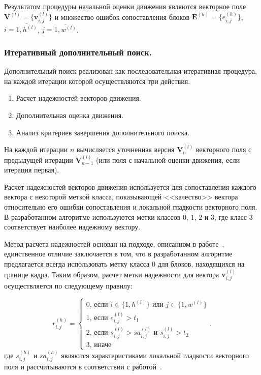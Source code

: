 Результатом процедуры начальной оценки движения являются векторное поле $\mathbf{V}^{(l)}=\lbrace\mathbf{v}_{i,j}^{(l)}\rbrace$ и множество ошибок сопоставления блоков $\mathbf{E}^{(h)}=\lbrace e_{i,j}^{(h)} \rbrace$, $i=\overline{1,h^{(l)}}$, $j=\overline{1,w^{(l)}}$.

\subsubsection{Итеративный дополнительный поиск.}
\label{chap2:4:1:3}

Дополнительный поиск реализован как последовательная итеративная процедура, на каждой итерации которой осуществляются три действия.
\begin{enumerate}
\item Расчет надежностей векторов движения.
\item Дополнительная оценка движения.
\item Анализ критериев завершения дополнительного поиска.
\end{enumerate}

На каждой итерации $n$ вычисляется уточненная версия $\mathbf{V}_n^{(l)}$ векторного поля с предыдущей итерации $\mathbf{V}_{n-1}^{(l)}$ (или поля с начальной оценки движения, если итерация первая).

Расчет надежностей векторов движения используется для сопоставления каждого вектора с некоторой меткой класса, показывающей <<качество>> вектора относительно его ошибки сопоставления и локальной гладкости векторного поля. В разработанном алгоритме используются метки классов $0$, $1$, $2$ и $3$, где класс $3$ соответствует наиболее надежному вектору.

Метод расчета надежностей основан на подходе, описанном в работе~\cite{Huang2009}, единственное отличие заключается в том, что в разработанном алгоритме предлагается всегда использовать метку класса $0$ для блоков, находящихся на границе кадра. Таким образом, расчет метки надежности для вектора $\mathbf{v}_{i,j}^{(l)}$ осуществляется по следующему правилу:

\begin{equation*}
r_{i,j}^{(h)}=
	\begin{cases}
	0 \text{, если $i\in\lbrace1,h^{(l)}\rbrace$ или $j\in\lbrace1,w^{(l)}\rbrace$}\\
	1 \text{, если $e_{i,j}^{(l)}>t_1$}\\
	2 \text{, если $s_{i,j}^{(l)}>sa_{i,j}^{(l)}$ и $s_{i,j}^{(l)}>t_2$}\\
	3 \text{, иначе}
	\end{cases}.
\end{equation*}
где $s_{i,j}^{(h)}$ и $sa_{i,j}^{(h)}$ являются характеристиками локальной гладкости векторного поля и рассчитываются в соответствии с работой~\cite{Huang2009a}.

